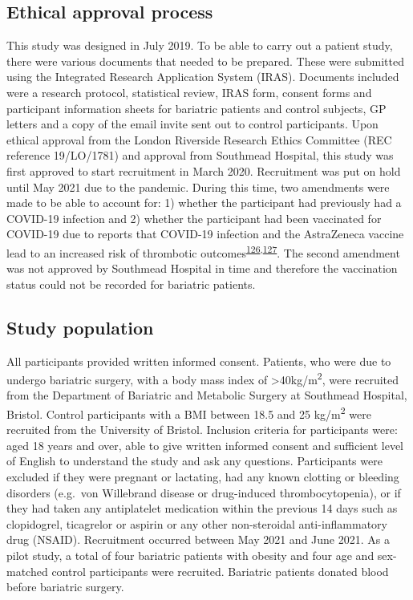 \documentclass[11pt,twoside]{bristolthesis}
\begin{document}
\hypertarget{ethical-approval-process}{%
\subsection{Ethical approval process}\label{ethical-approval-process}}

This study was designed in July 2019. To be able to carry out a patient study, there were various documents that needed to be prepared. These were submitted using the Integrated Research Application System (IRAS). Documents included were a research protocol, statistical review, IRAS form, consent forms and participant information sheets for bariatric patients and control subjects, GP letters and a copy of the email invite sent out to control participants. Upon ethical approval from the London Riverside Research Ethics Committee (REC reference 19/LO/1781) and approval from Southmead Hospital, this study was first approved to start recruitment in March 2020. Recruitment was put on hold until May 2021 due to the pandemic. During this time, two amendments were made to be able to account for: 1) whether the participant had previously had a COVID-19 infection and 2) whether the participant had been vaccinated for COVID-19 due to reports that COVID-19 infection and the AstraZeneca vaccine lead to an increased risk of thrombotic outcomes\textsuperscript{\protect\hyperlink{ref-Middeldorp2020}{126},\protect\hyperlink{ref-Scully2021}{127}}. The second amendment was not approved by Southmead Hospital in time and therefore the vaccination status could not be recorded for bariatric patients.

\hypertarget{study-population-1}{%
\subsection{Study population}\label{study-population-1}}

All participants provided written informed consent. Patients, who were due to undergo bariatric surgery, with a body mass index of \textgreater40kg/m\textsuperscript{2}, were recruited from the Department of Bariatric and Metabolic Surgery at Southmead Hospital, Bristol. Control participants with a BMI between 18.5 and 25 kg/m\textsuperscript{2} were recruited from the University of Bristol. Inclusion criteria for participants were: aged 18 years and over, able to give written informed consent and sufficient level of English to understand the study and ask any questions. Participants were excluded if they were pregnant or lactating, had any known clotting or bleeding disorders (e.g.~von Willebrand disease or drug-induced thrombocytopenia), or if they had taken any antiplatelet medication within the previous 14 days such as clopidogrel, ticagrelor or aspirin or any other non-steroidal anti-inflammatory drug (NSAID). Recruitment occurred between May 2021 and June 2021. As a pilot study, a total of four bariatric patients with obesity and four age and sex-matched control participants were recruited. Bariatric patients donated blood before bariatric surgery.
\end{document}
